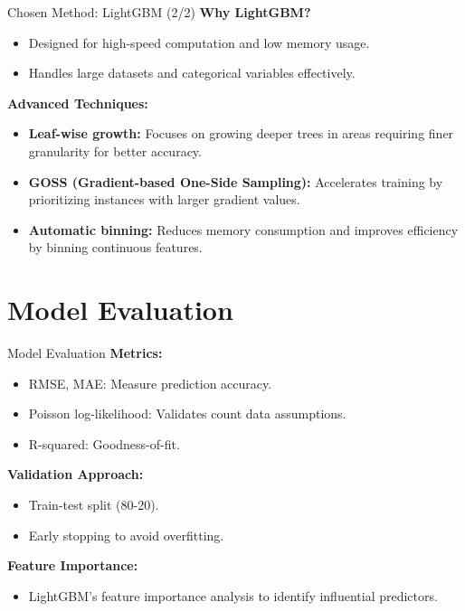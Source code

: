 \documentclass{beamer}\usepackage[]{graphicx}\usepackage[]{xcolor}
\begin{document}
\begin{frame}{Chosen Method: LightGBM (2/2)}
\textbf{Why LightGBM?}
\begin{itemize}
    \item Designed for high-speed computation and low memory usage.
    \item Handles large datasets and categorical variables effectively.
\end{itemize}

\textbf{Advanced Techniques:}
\begin{itemize}
    \item \textbf{Leaf-wise growth:} Focuses on growing deeper trees in areas requiring finer granularity for better accuracy.
    \item \textbf{GOSS (Gradient-based One-Side Sampling):} Accelerates training by prioritizing instances with larger gradient values.
    \item \textbf{Automatic binning:} Reduces memory consumption and improves efficiency by binning continuous features.
\end{itemize}

\end{frame}

\section{Model Evaluation}

\begin{frame}{Model Evaluation}
\textbf{Metrics:}
\begin{itemize}
    \item RMSE, MAE: Measure prediction accuracy.
    \item Poisson log-likelihood: Validates count data assumptions.
    \item R-squared: Goodness-of-fit.
\end{itemize}

\textbf{Validation Approach:}
\begin{itemize}
    \item Train-test split (80-20).
    \item Early stopping to avoid overfitting.
\end{itemize}

\textbf{Feature Importance:}
\begin{itemize}
    \item LightGBM's feature importance analysis to identify influential predictors.
\end{itemize}
\end{frame}
\end{document}
